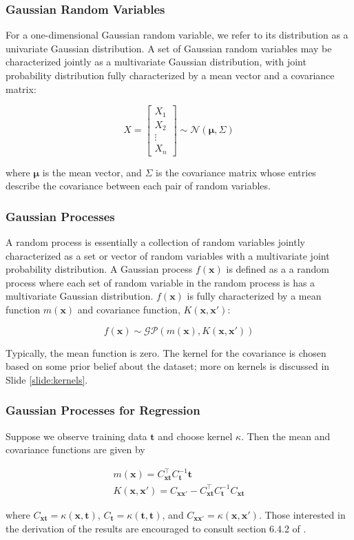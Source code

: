 \documentclass[pdf]{beamer}
\begin{document}
\begin{frame}
  \frametitle{Gaussian Random Variables}
For a one-dimensional Gaussian random variable, we refer to its distribution as a univariate Gaussian distribution. A
set of Gaussian random variables may be characterized jointly as a multivariate Gaussian distribution, with joint
probability distribution fully characterized by a mean vector and a covariance matrix:

\[
  X = \begin{bmatrix}
           X_{1} \\
           X_{2} \\
           \vdots \\
           X_{n}
         \end{bmatrix}   \sim \mathcal{N}(\boldsymbol{\mu},\Sigma)
\]

where $\boldsymbol{\mu}$ is the mean vector, and $\Sigma$ is the covariance matrix whose entries describe the covariance
between each pair of random variables.
\end{frame}

\begin{frame}
  \frametitle{Gaussian Processes}
A random process is essentially a collection of random variables jointly characterized  as a set or vector of random
variables with a multivariate joint probability distribution. A Gaussian process $f(\boldsymbol{x})$ is defined as a a
random process where each set of random variable in the random process is has a multivariate Gaussian distribution.
$f(\boldsymbol{x})$ is fully characterized by a mean function  $m(\boldsymbol{x})$ and covariance function,
$K(\boldsymbol{x},\boldsymbol{x'})$:

\[
  f(\boldsymbol{x})\sim\mathcal{GP}(m(\boldsymbol{x}),K(\boldsymbol{x},\boldsymbol{x'}))
\]

Typically, the mean function is zero. The kernel for the covariance is chosen based on some prior belief about the
dataset; more on kernels is discussed in Slide \ref{slide:kernels}.
\end{frame}

\begin{frame}
  \frametitle{Gaussian Processes for Regression}

Suppose we observe training data $\boldsymbol{t}$ and choose kernel $\kappa$. Then the mean and covariance functions are
given by 

\begin{gather*}
  m(\boldsymbol{x})=C_{\boldsymbol{x}\boldsymbol{t}}^\top C_{\boldsymbol{t}}^{-1}\boldsymbol{t} \\
  K(\boldsymbol{x},\boldsymbol{x'})=C_{\boldsymbol{x}\boldsymbol{x'}}-C_{\boldsymbol{x}\boldsymbol{t}}^\top
  C_{\boldsymbol{t}}^{-1}C_{\boldsymbol{x}\boldsymbol{t}}
\end{gather*}

where $C_{\boldsymbol{x}\boldsymbol{t}} = \kappa(\boldsymbol{x},\boldsymbol{t})$, $C_{\boldsymbol{t}} =
\kappa(\boldsymbol{t},\boldsymbol{t})$, and $C_{\boldsymbol{x}\boldsymbol{x'}} =
\kappa(\boldsymbol{x},\boldsymbol{x'})$.  Those interested in the derivation of the results are encouraged to consult
section 6.4.2 of \cite{bishop_pattern_2006}.
\end{frame}
\end{document}
